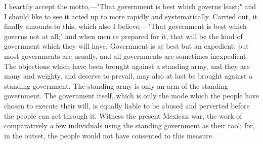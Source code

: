 I heartily accept the motto,---"That government is best which governs
least;" and I should like to see it acted up to more rapidly and
systematically.  Carried out, it finally amounts to this, which also I
believe,---"That government is best which governs not at all;" and when
men re prepared for it, that will be the kind of government which they
will have. Government is at best but an expedient; but most
governments are usually, and all governments are sometimes
inexpedient. The objections which have been brought against a standing
army, and they are many and weighty, and deserve to prevail, may also
at last be brought against a standing government. The standing army is
only an arm of the standing government. The government itself, which
is only the mode which the people have chosen to execute their will,
is equally liable to be abused and perverted before the people can act
through it. Witness the present Mexican war, the work of comparatively
a few individuals using the standing government as their tool; for, in
the outset, the people would not have consented to this measure.\par 
